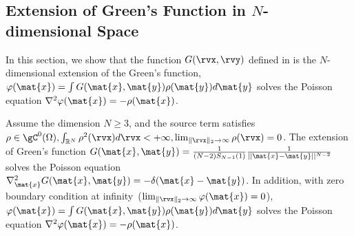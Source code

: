 \subsection{{Extension of Green's Function in $N$-dimensional Space}}
\label{app:green}
In this section, we show that the function $G(\rvx, \rvy)$ defined in  is the $N$-dimensional extension of the Green's function,     $\varphi(\mat{x}) = \int G(\mat{x},\mat{y})\rho(\mat{y})d\mat{y}$ solves the Poisson equation $\nabla^2\varphi(\mat{x}) = -\rho(\mat{x})$.
\begin{lemma}
\label{lemma:green}
Assume the dimension $N\ge 3$, and the source term satisfies $\rho \in \gC^0(\Omega), \int_{\mathbb{R}^N}\rho^2(\rvx)d\rvx<+\infty, \lim_{\parallel \rvx \parallel_2 \to \infty} \rho(\rvx) = 0$. The extension of Green's function $G(\mat{x},\mat{y})=\frac{1}{(N-2)S_{N-1}(1)}\frac{1}{||\mat{x}-\mat{y}||^{N-2}}$ solves the Poisson equation $\nabla^2_{\mat{x}} G(\mat{x},\mat{y})=-\delta(\mat{x}-\mat{y})$. In addition, with zero boundary condition at infinity~($\lim_{\parallel \rvx \parallel_2 \to \infty}\varphi(\mat{x})=0$), $\varphi(\mat{x}) = \int G(\mat{x},\mat{y})\rho(\mat{y})d\mat{y}$ solves the Poisson equation $\nabla^2\varphi(\mat{x}) = -\rho(\mat{x})$.
\end{lemma}

